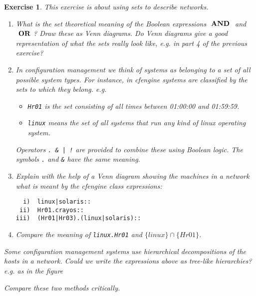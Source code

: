 \documentclass{book}
\newtheorem{exercise}{Exercise}
\def\CAND{~{\rm \bf AND}~}
\def\COR{~{\rm \bf OR}~}
\begin{document}
\begin{solution}
\end{solution}


\begin{exercise}
This exercise is about using sets to describe networks.
\begin{enumerate}
\item What is the set theoretical meaning of the Boolean expressions $\CAND$ and
$\COR$? Draw these as Venn diagrams. Do Venn diagrams give a good
representation of what the sets really look like, e.g. in part 4 of
the previous exercise?


\item In configuration management we think of systems as belonging to a set
of all possible system types. For instance, in cfengine systems are classified
by the sets to which they belong. e.g.
\begin{itemize}
\item {\tt Hr01} is the set consisting of all times between 01:00:00 and 01:59:59.
\item {\tt linux} means the set of all systems that run any kind of linux operating system.
\end{itemize}
Operators \verb+. & | !+ are provided to combine these using Boolean logic. The
symbols \verb+.+ and \verb+&+ have the same meaning.
\item Explain with the help of a Venn diagram showing the machines in a network
what is meant by the cfengine class expressions:
\begin{verbatim}
  i)  linux|solaris::
 ii)  Hr01.crayos::
iii)  (Hr01|Hr03).(linux|solaris)::
\end{verbatim}


\item Compare the meaning of 
{\tt linux.Hr01} and $\{ linux \} \cap \{ Hr01 \}$.
\end{enumerate}

\item Some configuration management systems use hierarchical decompositions of
the hosts in a network. Could we write the expressions above as tree-like
hierarchies? e.g. as in the figure
\begin{figure}[ht]
\end{figure}
Compare these two methods critically.
\end{exercise}
\begin{solution}
\end{solution}
\end{document}
